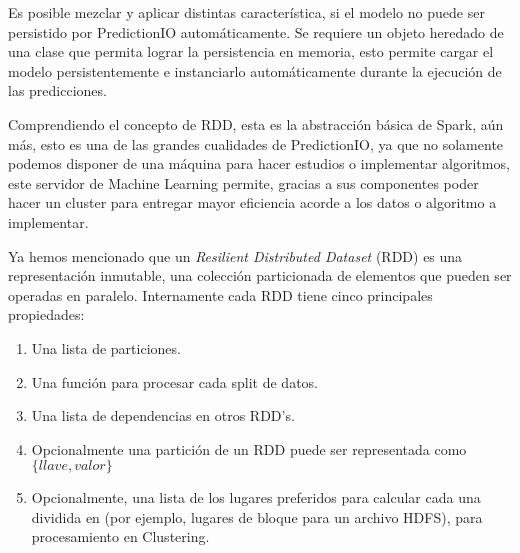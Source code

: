   Es posible mezclar y aplicar distintas característica, si el modelo no puede ser persistido por PredictionIO automáticamente. Se requiere un objeto  heredado de una clase que permita lograr la persistencia en memoria, esto permite cargar el modelo persistentemente e instanciarlo automáticamente durante la ejecución de las predicciones.



  Comprendiendo el concepto de RDD, esta es la abstracción básica de Spark, aún más, esto es una de las grandes cualidades de PredictionIO, ya que no solamente podemos disponer de una máquina para hacer estudios o implementar algoritmos, este servidor de Machine Learning permite, gracias a sus componentes poder hacer un cluster para entregar mayor eficiencia acorde a los datos o algoritmo a implementar.

  Ya hemos mencionado que un \emph{Resilient Distributed Dataset} (RDD) es una representación inmutable, una colección particionada de elementos que pueden ser operadas en paralelo. Internamente cada RDD tiene cinco principales propiedades:


  \begin{enumerate}
    \item Una lista de particiones.
    \item Una función para procesar cada split de datos.
    \item Una lista de dependencias en otros RDD's. 
    \item Opcionalmente una partición de un RDD puede ser representada como $\{llave,valor\}$ 

    \item Opcionalmente, una lista de los lugares preferidos para calcular cada una dividida en (por ejemplo, lugares de bloque para un archivo HDFS), para procesamiento en Clustering.

  \end{enumerate}




















